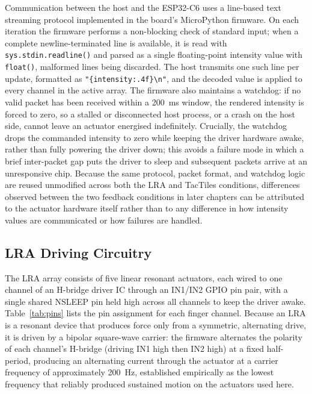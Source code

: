 \documentclass[12pt, a4paper]{report}
\begin{document}
Communication between the host and the ESP32-C6 uses a line-based text streaming protocol implemented in the board's MicroPython firmware. On each iteration the firmware performs a non-blocking check of standard input; when a complete newline-terminated line is available, it is read with \texttt{sys.stdin.readline()} and parsed as a single floating-point intensity value with \texttt{float()}, malformed lines being discarded. The host transmits one such line per update, formatted as \texttt{"\{intensity:.4f\}\textbackslash n"}, and the decoded value is applied to every channel in the active array. The firmware also maintains a watchdog: if no valid packet has been received within a 200~ms window, the rendered intensity is forced to zero, so a stalled or disconnected host process, or a crash on the host side, cannot leave an actuator energised indefinitely. Crucially, the watchdog drops the commanded intensity to zero while keeping the driver hardware awake, rather than fully powering the driver down; this avoids a failure mode in which a brief inter-packet gap puts the driver to sleep and subsequent packets arrive at an unresponsive chip. Because the same protocol, packet format, and watchdog logic are reused unmodified across both the LRA and TacTiles conditions, differences observed between the two feedback conditions in later chapters can be attributed to the actuator hardware itself rather than to any difference in how intensity values are communicated or how failures are handled.

\subsection{LRA Driving Circuitry}
The LRA array consists of five linear resonant actuators, each wired to one channel of an H-bridge driver IC through an IN1/IN2 GPIO pin pair, with a single shared NSLEEP pin held high across all channels to keep the driver awake. Table~\ref{tab:pins} lists the pin assignment for each finger channel. Because an LRA is a resonant device that produces force only from a symmetric, alternating drive, it is driven by a bipolar square-wave carrier: the firmware alternates the polarity of each channel's H-bridge (driving IN1 high then IN2 high) at a fixed half-period, producing an alternating current through the actuator at a carrier frequency of approximately 200~Hz, established empirically as the lowest frequency that reliably produced sustained motion on the actuators used here.
\end{document}
